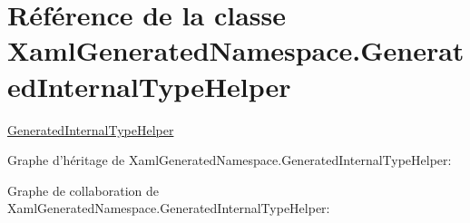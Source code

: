 \hypertarget{class_xaml_generated_namespace_1_1_generated_internal_type_helper}{\section{Référence de la classe Xaml\+Generated\+Namespace.\+Generated\+Internal\+Type\+Helper}
\label{class_xaml_generated_namespace_1_1_generated_internal_type_helper}
}


\hyperlink{class_xaml_generated_namespace_1_1_generated_internal_type_helper}{Generated\+Internal\+Type\+Helper}  




Graphe d'héritage de Xaml\+Generated\+Namespace.\+Generated\+Internal\+Type\+Helper\+:


Graphe de collaboration de Xaml\+Generated\+Namespace.\+Generated\+Internal\+Type\+Helper\+:
